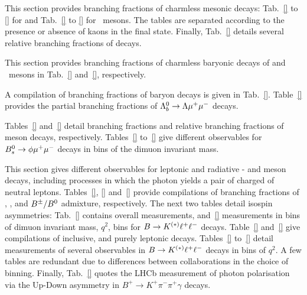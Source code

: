 \label{sec:rare-charmless}

This section provides branching fractions of charmless mesonic decays: Tab.~\ref{} to \ref{} for \Bd and Tab.~\ref{} to \ref{} for \Bp\ mesons. The tables are separated according to the presence or absence of kaons in the final state. Finally, Tab.~\ref{} details several relative branching fractions of \Bz decays.

%


\label{sec:rare-bary}

This section provides branching fractions of charmless baryonic decays of \Bz and \Bp\ mesons in Tab.~\ref{} and~\ref{}, respectively.

%


\label{sec:rare-lb}

A compilation of branching fractions of \Lb baryon decays is given in Tab.~\ref{}. Table~\ref{} provides the partial branching fractions of $\Lambda_b^0\to\Lambda\mu^+\mu^-$ decays.

%


\label{sec:rare-bs}

Tables~\ref{} and~\ref{} detail branching fractions and relative branching fractions of \Bs meson decays, respectively. Tables~\ref{} to~\ref{} give different observables for $B^0_s\to\phi\mu^+\mu^-$ decays in bins of the dimuon invariant mass.

%


\label{sec:rare-radll}

This section gives different observables for leptonic and radiative \Bz- and \Bp meson decays, including processes in which the photon yields a pair of charged of neutral leptons. Tables~\ref{}, \ref{} and~\ref{} provide compilations of branching fractions of \Bp, \Bz, and $B^\pm/B^0$ admixture, respectively. The next two tables detail isospin asymmetries: Tab.~\ref{} contains overall measurements, and~\ref{} measurements in bins of dimuon invariant mass, $q^2$, bins for $B\to K^{(\ast)}\ell^+\ell^-$ decays. Table~\ref{} and~\ref{} give compilations of inclusive, and purely leptonic decays. Tables~\ref{} to~\ref{} detail measurements of several observables in $B\to K^{(\ast)}\ell^+\ell^-$ decays in bins of $q^2$. A few tables are redundant due to differences between collaborations in the choice of binning. Finally, Tab.~\ref{} quotes the LHCb measurement of photon polarisation via the Up-Down asymmetry in $B^+ \to K^+ \pi^- \pi^+ \gamma$ decays.

